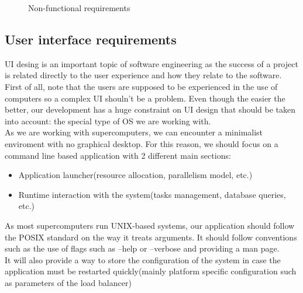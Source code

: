 \begin{figure}[ht!]
\begin{center}
\begin{tabular}{||c | c | p{7cm} | c||}
    \end{tabular}

  \end{center}

  \caption{Non-functional requirements}
  \label{non_functional:fig}
\end{figure}

\subsection{User interface requirements}

UI desing is an important topic of software engineering as the success of a
project is related directly to the user experience and how they relate to the
software.\\

First of all, note that the users are supposed to be experienced in the use of
computers so a complex UI shouln't be a problem. Even though the easier the
better, our development has a huge constraint on UI design that should be
taken into account: the special type of OS we are working with.\\

As we are working with supercomputers, we can encounter a minimalist enviroment
with no graphical desktop. For this reason, we should focus on a command line
based application with 2 different main sections:\\
\begin{itemize}
  \item Application launcher(resource allocation, parallelism model, etc.)
  \item Runtime interaction with the system(tasks management, database
  queries, etc.)
\end{itemize}

As most supercomputers run UNIX-based systems, our application should follow
the POSIX\cite{POSIX_arguments} standard on the way it treats arguments.
It should follow conventions such as the use of flags such as --help or
--verbose and providing a man page.\\

It will also provide a way to store the configuration of the system in case
the application must be restarted quickly(mainly platform specific
configuration such as parameters of the load balancer) \\
